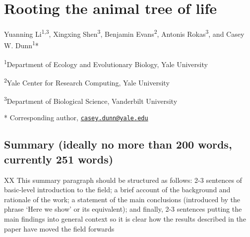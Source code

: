 \documentclass[]{article}
\title{}
\author{}
\date{}
\begin{document}
\hypertarget{rooting-the-animal-tree-of-life}{%
\section{Rooting the animal tree of
life}\label{rooting-the-animal-tree-of-life}}

Yuanning Li\textsuperscript{1,3}, Xingxing Shen\textsuperscript{3},
Benjamin Evans\textsuperscript{2}, Antonis Rokas\textsuperscript{3}, and
Casey W. Dunn\textsuperscript{1}*

\textsuperscript{1}Department of Ecology and Evolutionary Biology, Yale
University

\textsuperscript{2}Yale Center for Research Computing, Yale University

\textsuperscript{3}Department of Biological Science, Vanderbilt
University

* Corresponding author,
\href{mailto:casey.dunn@yale.edu}{\nolinkurl{casey.dunn@yale.edu}}

\hypertarget{summary-ideally-no-more-than-200-words-currently-251-words}{%
\subsection{Summary (ideally no more than 200 words, currently 251
words)}\label{summary-ideally-no-more-than-200-words-currently-251-words}}

XX This summary paragraph should be structured as follows: 2-3 sentences
of basic-level introduction to the field; a brief account of the
background and rationale of the work; a statement of the main
conclusions (introduced by the phrase `Here we show' or its equivalent);
and finally, 2-3 sentences putting the main findings into general
context so it is clear how the results described in the paper have moved
the field forwards
\end{document}
